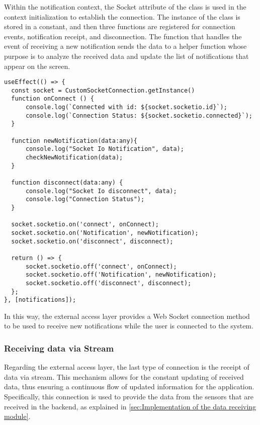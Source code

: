 Within the notification context, the Socket attribute of the class is used in the context initialization to establish the connection. The instance of the class is stored in a constant, and then three functions are registered for connection events, notification receipt, and disconnection. The function that handles the event of receiving a new notification sends the data to a helper function whose purpose is to analyze the received data and update the list of notifications that appear on the screen.

\begin{Verbatim}[fontsize=\small, baselinestretch=0.8]
useEffect(() => {
  const socket = CustomSocketConnection.getInstance()
  function onConnect () {
      console.log(`Connected with id: ${socket.socketio.id}`);
      console.log(`Connection Status: ${socket.socketio.connected}`);
  }

  function newNotification(data:any){
      console.log("Socket Io Notification", data);
      checkNewNotification(data);
  }

  function disconnect(data:any) {
      console.log("Socket Io disconnect", data);
      console.log("Connection Status");
  }

  socket.socketio.on('connect', onConnect);
  socket.socketio.on('Notification', newNotification);
  socket.socketio.on('disconnect', disconnect);

  return () => {
      socket.socketio.off('connect', onConnect);
      socket.socketio.off('Notification', newNotification);
      socket.socketio.off('disconnect', disconnect);
  };
}, [notifications]);
\end{Verbatim}

In this way, the external access layer provides a Web Socket connection method to be used to receive new notifications while the user is connected to the system.

\subsubsection{Receiving data via Stream}\label{subsec:streamData}

Regarding the external access layer, the last type of connection is the receipt of data via stream. This mechanism allows for the constant updating of received data, thus ensuring a continuous flow of updated information for the application. Specifically, this connection is used to provide the data from the sensors that are received in the backend, as explained in \ref{sec:Implementation of the data receiving module}.

